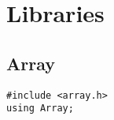 \section{Libraries}
\newcommand{\code}[1]{\texttt{#1}}
\newcommand{\var}[1]{\texttt{#1}}
\newcommand{\vvar}[1]{{\tt\textbf{\textit{#1}}}}
\ifscreen
\newcommand{\defunlabel}[1]{%
  \parbox[b]{\labelwidth}{\makebox[0pt][l]{\colorbox{lightblue}{#1}}\\}}
\else
\newcommand{\defunlabel}[1]{%
  \parbox[b]{\labelwidth}{\makebox[0pt][l]{#1}\\}}
\fi
\newenvironment{defun}[2]{%
  \begin{list}{}{}%
    \renewcommand{\makelabel}{\defunlabel}%
    \index{#1@\texttt{#1}}%
  \item[{\tt\textbf{#1}#2}]}{\end{list}}
\newenvironment{defun2}[3]{%
  \begin{list}{}{}%
    \renewcommand{\makelabel}{\defunlabel}%
    \index{#2@\texttt{#2()}}%
  \item[{\tt {#1}~\textbf{#2}{#3}}]}{\end{list}}
\newenvironment{deexn}[2]{%
  \begin{list}{}{}%
    \renewcommand{\makelabel}{\defunlabel}%
    \index{#1@\texttt{#1}}%
  \item[{\tt xtunion exn~\lb~extern~\textbf{#1}{#2}~\rb;}]}{\end{list}}
\newcommand{\tindex}[1]{}
\newcommand{\exindex}[1]{}

\subsection{Array}
\begin{verbatim}
#include <array.h>
using Array;
\end{verbatim}

